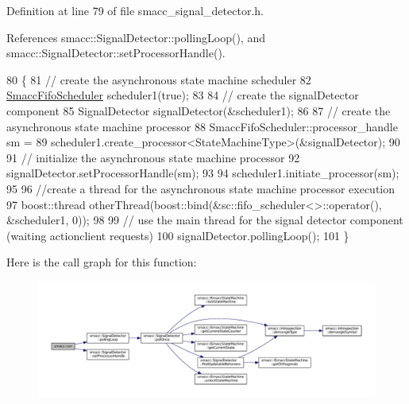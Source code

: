 Definition at line 79 of file smacc\+\_\+signal\+\_\+detector.\+h.



References smacc\+::\+Signal\+Detector\+::polling\+Loop(), and smacc\+::\+Signal\+Detector\+::set\+Processor\+Handle().


\begin{DoxyCode}
80 \{
81     \textcolor{comment}{// create the asynchronous state machine scheduler}
82     \hyperlink{smacc__fifo__scheduler_8h_a0063e275231c80d5f97df21d17257bf7}{SmaccFifoScheduler} scheduler1(\textcolor{keyword}{true});
83 
84     \textcolor{comment}{// create the signalDetector component}
85     SignalDetector signalDetector(&scheduler1);
86 
87     \textcolor{comment}{// create the asynchronous state machine processor}
88     SmaccFifoScheduler::processor\_handle sm =
89         scheduler1.create\_processor<StateMachineType>(&signalDetector);
90 
91     \textcolor{comment}{// initialize the asynchronous state machine processor}
92     signalDetector.setProcessorHandle(sm);
93 
94     scheduler1.initiate\_processor(sm);
95 
96     \textcolor{comment}{//create a thread for the asynchronous state machine processor execution}
97     boost::thread otherThread(boost::bind(&sc::fifo\_scheduler<>::operator(), &scheduler1, 0));
98 
99     \textcolor{comment}{// use the  main thread for the signal detector component (waiting actionclient requests)}
100     signalDetector.pollingLoop();
101 \}
\end{DoxyCode}


Here is the call graph for this function\+:
\nopagebreak
\begin{figure}[H]
\begin{center}
\leavevmode
\includegraphics[width=350pt]{namespacesmacc_a47ac3b8d2968b1ba4152afd64ab66bd0_cgraph}
\end{center}
\end{figure}


